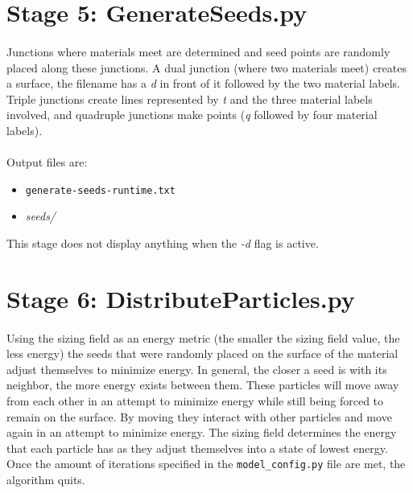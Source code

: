 \documentclass[fleqn,12pt,openany]{book}
\begin{document}
\section{Stage 5: GenerateSeeds.py}

\paragraph{}
Junctions where materials meet are determined and seed points are randomly 
placed along these junctions.  A dual junction (where two materials meet) 
creates a surface, the filename has a \emph{d} in front of it followed by the 
two material labels.  Triple junctions create lines represented by \emph{t} and 
the three material labels involved, and quadruple junctions make points 
(\emph{q} followed by four material labels).  \\ \\

Output files are:
\begin{itemize}

\item{\verb+generate-seeds-runtime.txt+} 
\item{\emph{seeds/}}

\end{itemize}

This stage does not display anything when the \emph{-d} flag is active.

\section{Stage 6: DistributeParticles.py}

\paragraph{}
Using the sizing field as an energy metric (the smaller the sizing field value, 
the less energy) the seeds that were randomly placed on the surface of the 
material adjust themselves to minimize energy.  In general, the closer a seed 
is with its neighbor, the more energy exists between them.  These particles 
will move away from each other in an attempt to minimize energy while still 
being forced to remain on the surface.  By moving they interact with other 
particles and move again in an attempt to minimize energy.  The sizing field 
determines the energy that each particle has as they adjust themselves into a 
state of lowest energy.  Once the amount of iterations specified in the 
\verb+model_config.py+ file are met, the algorithm quits.  \\ \\
\end{document}
